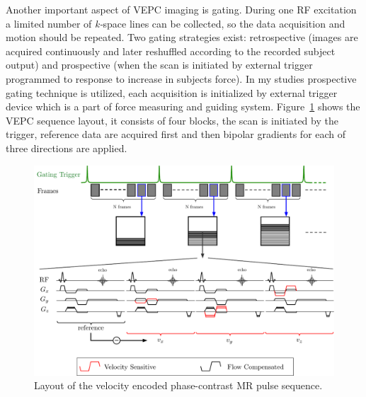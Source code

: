 Another important aspect of VEPC imaging is gating. 
During one RF excitation a limited number of \mbox{\textit{k-}space} lines can be collected, so the data acquisition and motion should be repeated. 
Two gating strategies exist: retrospective (images are acquired continuously and later reshuffled according to the recorded subject output) and prospective (when the scan is initiated by external trigger programmed to response to increase in subjects force). 
In my studies prospective gating technique is utilized, each acquisition is initialized by external trigger device which is a part of force measuring and guiding system. 
Figure~\ref{fig: VEPC} shows the VEPC sequence layout, it consists of four blocks, the scan is initiated by the trigger, reference data are acquired first and then bipolar gradients for each of three directions are applied.
\begin{figure}
\centering
\vspace{+0.2cm}
\centering
\includegraphics[scale =1]{Figures/VEPC.pdf}
\caption[Layout of the velocity encoded phase-contrast MR pulse sequence]{Layout of the velocity encoded phase-contrast MR pulse sequence.}
\label{fig: VEPC}
\end{figure}
